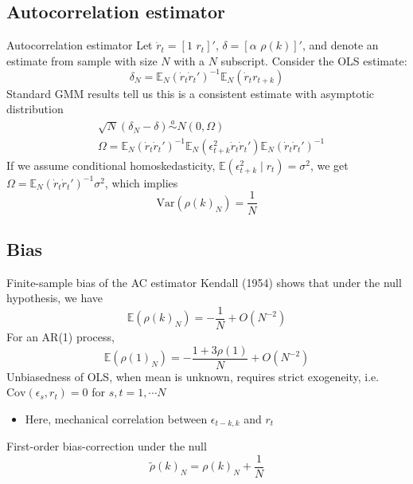 \documentclass[xcolor=table, aspectratio=169]{beamer}
\begin{document}
\subsection{Autocorrelation estimator}

\begin{frame}{Autocorrelation estimator}
Let $\dot{r}_t = [ 1 \hspace{4pt} r_t ]'$, $\delta = [ \alpha \hspace{4pt} \rho(k) ]'$, and denote an estimate from sample with size $N$ with a $N$ subscript. Consider the OLS estimate:
$$\delta_N = \mathbb{E}_N \left( \dot{r}_t \dot{r}_t' \right)^{-1} \mathbb{E}_N \left( \dot{r}_t r_{t+k} \right)$$
Standard GMM results tell us this is a consistent estimate with asymptotic distribution
\begin{align*}
& \sqrt{N} (\delta_N - \delta) \overset{a}{\sim} N(0,\Omega) \\
& \Omega = \mathbb{E}_N \left( \dot{r}_t \dot{r}_t' \right)^{-1} \mathbb{E}_N \left( \epsilon_{t+k}^2 \dot{r}_t \dot{r}_t' \right) \mathbb{E}_N \left( \dot{r}_t \dot{r}_t' \right)^{-1}
\end{align*}
If we assume conditional homoskedasticity, $\mathbb{E} \left( \epsilon_{t+k}^2 \mid r_t \right) = \sigma^2$, we get $\Omega = \mathbb{E}_N \left( \dot{r}_t \dot{r}_t' \right)^{-1} \sigma^2$, which implies
$$\text{Var}\left( \rho(k)_N \right) = \frac{1}{N}$$
\end{frame}

\subsection{Bias}
\begin{frame}{Finite-sample bias of the AC estimator}
Kendall (1954) shows that under the null hypothesis, we have
$$\mathbb{E}(\rho(k)_N) = -\frac{1}{N} + O(N^{-2})$$
For an AR(1) process, 
$$\mathbb{E}(\rho(1)_N) = -\frac{1+3\rho(1)}{N} + O(N^{-2})$$
Unbiasedness of OLS, when mean is unknown, requires strict exogeneity, i.e. $\text{Cov}\left(\epsilon_s,r_t\right) = 0$ for $s,t = 1, \cdots N$
\begin{itemize}
\item Here, mechanical correlation between $\epsilon_{t-k,k}$ and $r_t$
\end{itemize}
First-order bias-correction under the null
$$\tilde{\rho}(k)_N = \rho(k)_N + \frac{1}{N}$$
\end{frame}
\end{document}
